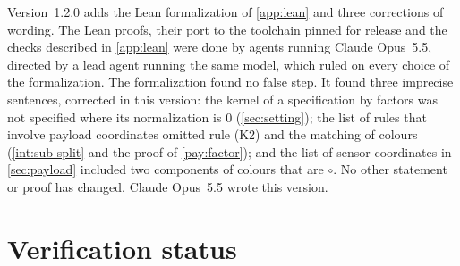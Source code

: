 Version~1.2.0 adds the Lean formalization of \cref{app:lean} and three corrections of wording. The Lean proofs, their port to the toolchain pinned for release and the checks described in \cref{app:lean} were done by agents running Claude Opus~5.5, directed by a lead agent running the same model, which ruled on every choice of the formalization. The formalization found no false step. It found three imprecise sentences, corrected in this version: the kernel of a specification by factors was not specified where its normalization is $0$ (\cref{sec:setting}); the list of rules that involve payload coordinates omitted rule (K2) and the matching of colours (\cref{int:sub-split} and the proof of \cref{pay:factor}); and the list of sensor coordinates in \cref{sec:payload} included two components of colours that are $\circ$. No other statement or proof has changed. Claude Opus~5.5 wrote this version.

\section*{Verification status}

